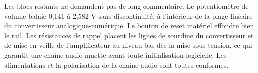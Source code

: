 Les blocs restants ne demandent pas de long commentaire. Le potentiomètre de volume balaie 0,141 à 2,582 V sans discontinuité, à l'intérieur de la plage linéaire du convertisseur analogique-numérique. Le bouton de reset matériel effondre bien le rail. Les résistances de rappel placent les lignes de sourdine du convertisseur et de mise en veille de l'amplificateur au niveau bas dès la mise sous tension, ce qui garantit une chaîne audio muette avant toute initialisation logicielle. Les alimentations et la polarisation de la chaîne audio sont toutes conformes.